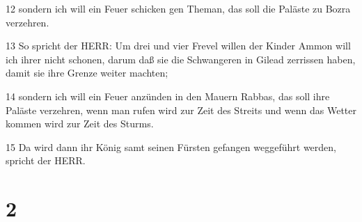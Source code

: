 \par 12 sondern ich will ein Feuer schicken gen Theman, das soll die Paläste zu Bozra verzehren.
\par 13 So spricht der HERR: Um drei und vier Frevel willen der Kinder Ammon will ich ihrer nicht schonen, darum daß sie die Schwangeren in Gilead zerrissen haben, damit sie ihre Grenze weiter machten;
\par 14 sondern ich will ein Feuer anzünden in den Mauern Rabbas, das soll ihre Paläste verzehren, wenn man rufen wird zur Zeit des Streits und wenn das Wetter kommen wird zur Zeit des Sturms.
\par 15 Da wird dann ihr König samt seinen Fürsten gefangen weggeführt werden, spricht der HERR.

\chapter{2}

